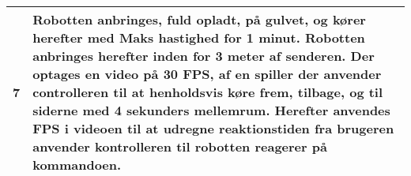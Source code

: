 \begin{table}[]
\begin{tabular}{c p{7cm}}
7 & Robotten anbringes, fuld opladt, på gulvet, og kører herefter med Maks hastighed for 1 minut. Robotten anbringes herefter inden for 3 meter af senderen. Der optages en video på 30 FPS, af en spiller der anvender controlleren til at henholdsvis køre frem, tilbage, og til siderne med 4 sekunders mellemrum. Herefter anvendes FPS i videoen til at udregne reaktionstiden fra brugeren anvender kontrolleren til robotten reagerer på kommandoen. \\\midrule
\end{tabular}
\end{table}
